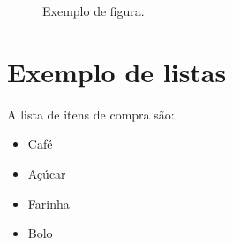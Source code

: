 \documentclass[11pt,twocolumn]{article}
\begin{document}
\begin{figure}[h]
\centering
  
  
  \caption{Exemplo de figura.}  
  \label{fig_exemplo}
\end{figure}


\section{Exemplo de listas}

A lista de itens de compra são: 

\begin{itemize}
  \item Café
  \item Açúcar
  \item Farinha
  \item Bolo
\end{itemize}
\end{document}
